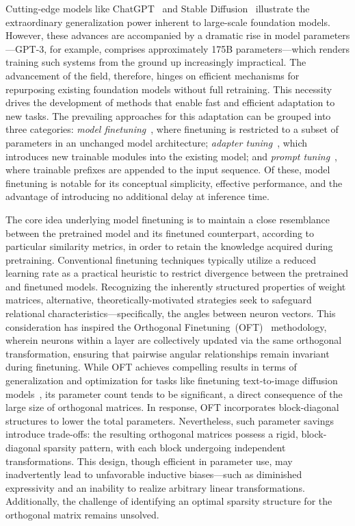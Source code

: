 Cutting-edge models like ChatGPT~\cite{brown2020language,chen2021evaluating} and Stable Diffusion~\cite{rombach2022high} illustrate the extraordinary generalization power inherent to large-scale foundation models. However, these advances are accompanied by a dramatic rise in model parameters—GPT-3, for example, comprises approximately 175B parameters—which renders training such systems from the ground up increasingly impractical. The advancement of the field, therefore, hinges on efficient mechanisms for repurposing existing foundation models without full retraining. This necessity drives the development of methods that enable fast and efficient adaptation to new tasks. The prevailing approaches for this adaptation can be grouped into three categories: \emph{model finetuning}~\cite{hulora2022,zaken2022bitfit,guo2020parameter,raffel2020exploring,qiu2023controlling,zhang2022adaptive,chavan2023one}, where finetuning is restricted to a subset of parameters in an unchanged model architecture; \emph{adapter tuning}~\cite{rebuffi2017learning,houlsby2019parameter,pfeiffer2020adapterfusion,lin2020exploring,he2021towards}, which introduces new trainable modules into the existing model; and \emph{prompt tuning}~\cite{li2021prefix,lester2021power}, where trainable prefixes are appended to the input sequence. Of these, model finetuning is notable for its conceptual simplicity, effective performance, and the advantage of introducing no additional delay at inference time.

The core idea underlying model finetuning is to maintain a close resemblance between the pretrained model and its finetuned counterpart, according to particular similarity metrics, in order to retain the knowledge acquired during pretraining. Conventional finetuning techniques typically utilize a reduced learning rate as a practical heuristic to restrict divergence between the pretrained and finetuned models. Recognizing the inherently structured properties of weight matrices, alternative, theoretically-motivated strategies seek to safeguard relational characteristics—specifically, the angles between neuron vectors. This consideration has inspired the Orthogonal Finetuning~(OFT)~\cite{qiu2023controlling} methodology, wherein neurons within a layer are collectively updated via the same orthogonal transformation, ensuring that pairwise angular relationships remain invariant during finetuning. While OFT achieves compelling results in terms of generalization and optimization for tasks like finetuning text-to-image diffusion models~\cite{qiu2023controlling}, its parameter count tends to be significant, a direct consequence of the large size of orthogonal matrices. In response, OFT incorporates block-diagonal structures to lower the total parameters. Nevertheless, such parameter savings introduce trade-offs: the resulting orthogonal matrices possess a rigid, block-diagonal sparsity pattern, with each block undergoing independent transformations. This design, though efficient in parameter use, may inadvertently lead to unfavorable inductive biases—such as diminished expressivity and an inability to realize arbitrary linear transformations. Additionally, the challenge of identifying an optimal sparsity structure for the orthogonal matrix remains unsolved.

